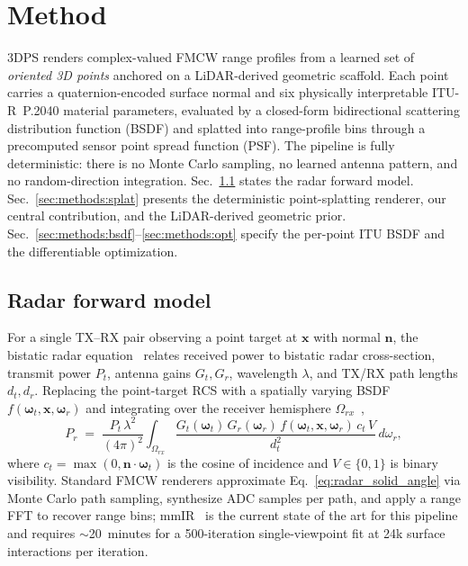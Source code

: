 \section{Method}
\label{sec:methods}

3DPS renders complex-valued FMCW range profiles from a learned set of \emph{oriented 3D points} anchored on a LiDAR-derived geometric scaffold. Each point carries a quaternion-encoded surface normal and six physically interpretable ITU-R~P.2040 material parameters, evaluated by a closed-form bidirectional scattering distribution function (BSDF) and splatted into range-profile bins through a precomputed sensor point spread function (PSF). The pipeline is fully deterministic: there is no Monte Carlo sampling, no learned antenna pattern, and no random-direction integration. Sec.~\ref{sec:methods:fwd} states the radar forward model. Sec.~\ref{sec:methods:splat} presents the deterministic point-splatting renderer, our central contribution, and the LiDAR-derived geometric prior. Sec.~\ref{sec:methods:bsdf}--\ref{sec:methods:opt} specify the per-point ITU BSDF and the differentiable optimization.

\subsection{Radar forward model}
\label{sec:methods:fwd}

For a single TX--RX pair observing a point target at $\mathbf{x}$ with normal $\mathbf{n}$, the bistatic radar equation~\cite{skolnik2001introduction} relates received power to bistatic radar cross-section, transmit power $P_t$, antenna gains $G_t,G_r$, wavelength $\lambda$, and TX/RX path lengths $d_t, d_r$. Replacing the point-target RCS with a spatially varying BSDF $f(\boldsymbol{\omega}_t, \mathbf{x}, \boldsymbol{\omega}_r)$ and integrating over the receiver hemisphere $\Omega_{rx}$~\cite{mmIR2026},
\begin{equation}
P_r \;=\; \frac{P_t\,\lambda^2}{(4\pi)^2}\!\!\int_{\Omega_{rx}}\!\!
\frac{G_t(\boldsymbol{\omega}_t)\,G_r(\boldsymbol{\omega}_r)\,
        f(\boldsymbol{\omega}_t,\mathbf{x},\boldsymbol{\omega}_r)\,c_t\,V}
       {d_t^2}\,d\omega_r,
\label{eq:radar_solid_angle}
\end{equation}
where $c_t = \max(0, \mathbf{n}\!\cdot\!\boldsymbol{\omega}_t)$ is the cosine of incidence and $V \in \{0,1\}$ is binary visibility. Standard FMCW renderers approximate Eq.~\eqref{eq:radar_solid_angle} via Monte Carlo path sampling, synthesize ADC samples per path, and apply a range FFT to recover range bins; mmIR~\cite{mmIR2026} is the current state of the art for this pipeline and requires ${\sim}$20~minutes for a 500-iteration single-viewpoint fit at 24k surface interactions per iteration.

